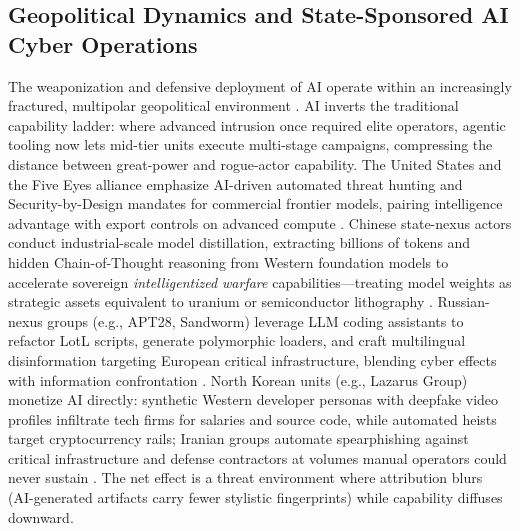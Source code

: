 \documentclass[conference,10pt,twocolumn,a4paper]{IEEEtran}
\begin{document}
\subsection{Geopolitical Dynamics and State-Sponsored AI Cyber Operations}
The weaponization and defensive deployment of AI operate within an increasingly fractured, multipolar geopolitical environment \cite{cisa_aa26_251a, five_eyes_ai_2026, enisa_etl_2025}. AI inverts the traditional capability ladder: where advanced intrusion once required elite operators, agentic tooling now lets mid-tier units execute multi-stage campaigns, compressing the distance between great-power and rogue-actor capability. The United States and the Five Eyes alliance emphasize AI-driven automated threat hunting and Security-by-Design mandates for commercial frontier models, pairing intelligence advantage with export controls on advanced compute \cite{five_eyes_ai_2026}. Chinese state-nexus actors conduct industrial-scale model distillation, extracting billions of tokens and hidden Chain-of-Thought reasoning from Western foundation models to accelerate sovereign \emph{intelligentized warfare} capabilities---treating model weights as strategic assets equivalent to uranium or semiconductor lithography \cite{cisa_aa26_251a}. Russian-nexus groups (e.g., APT28, Sandworm) leverage LLM coding assistants to refactor LotL scripts, generate polymorphic loaders, and craft multilingual disinformation targeting European critical infrastructure, blending cyber effects with information confrontation \cite{enisa_etl_2025, crowdstrike_gtr_2025}. North Korean units (e.g., Lazarus Group) monetize AI directly: synthetic Western developer personas with deepfake video profiles infiltrate tech firms for salaries and source code, while automated heists target cryptocurrency rails; Iranian groups automate spearphishing against critical infrastructure and defense contractors at volumes manual operators could never sustain \cite{enisa_etl_2025, slashnext_genai_2025}. The net effect is a threat environment where attribution blurs (AI-generated artifacts carry fewer stylistic fingerprints) while capability diffuses downward.
\end{document}
